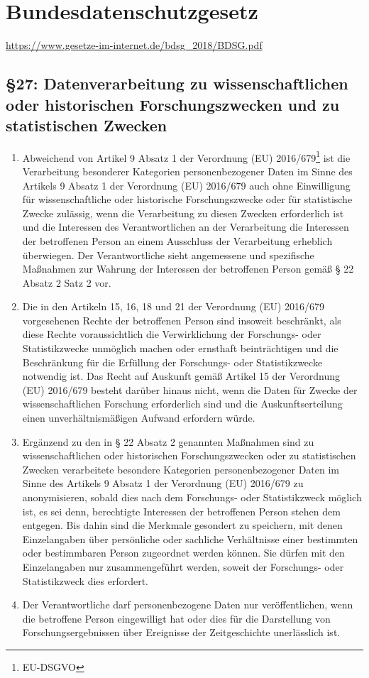 \documentclass[A4, 12pt]{scrbook}
\begin{document}
\chapter{Bundesdatenschutzgesetz}
\newline
\url{https://www.gesetze-im-internet.de/bdsg_2018/BDSG.pdf}
    \section[\S 27: Datenverarbeitung zu \dots statistischen Zwecken]{\S 27: Datenverarbeitung zu wissenschaftlichen oder historischen Forschungszwecken und zu statistischen Zwecken}
        \begin{enumerate}[label=(\arabic*)]
            \item Abweichend von Artikel 9 Absatz 1 der Verordnung (EU) 2016/679\footnote{EU-DSGVO} ist die Verarbeitung besonderer Kategorien personenbezogener Daten im Sinne des Artikels 9 Absatz 1 der Verordnung (EU) 2016/679 auch ohne Einwilligung für wissenschaftliche oder historische Forschungszwecke oder für statistische Zwecke zulässig, wenn die Verarbeitung zu diesen Zwecken erforderlich ist und die Interessen des Verantwortlichen an der Verarbeitung die Interessen der betroffenen Person an einem Ausschluss der Verarbeitung erheblich überwiegen. Der Verantwortliche sieht angemessene und spezifische Maßnahmen zur Wahrung der Interessen der betroffenen Person gemäß § 22 Absatz 2 Satz 2 vor.
            \item Die in den Artikeln 15, 16, 18 und 21 der Verordnung (EU) 2016/679 vorgesehenen Rechte der betroffenen Person sind insoweit beschränkt, als diese Rechte voraussichtlich die Verwirklichung der Forschungs- oder Statistikzwecke unmöglich machen oder ernsthaft beinträchtigen und die Beschränkung für die Erfüllung der Forschungs- oder Statistikzwecke notwendig ist. Das Recht auf Auskunft gemäß Artikel 15 der Verordnung (EU) 2016/679 besteht darüber hinaus nicht, wenn die Daten für Zwecke der wissenschaftlichen Forschung erforderlich sind und die Auskunftserteilung einen unverhältnismäßigen Aufwand erfordern würde.
            \item Ergänzend zu den in § 22 Absatz 2 genannten Maßnahmen sind zu wissenschaftlichen oder historischen Forschungszwecken oder zu statistischen Zwecken verarbeitete besondere Kategorien personenbezogener Daten im Sinne des Artikels 9 Absatz 1 der Verordnung (EU) 2016/679 zu anonymisieren, sobald dies nach dem Forschungs- oder Statistikzweck möglich ist, es sei denn, berechtigte Interessen der betroffenen Person stehen dem entgegen. Bis dahin sind die Merkmale gesondert zu speichern, mit denen Einzelangaben über persönliche oder sachliche Verhältnisse einer bestimmten oder bestimmbaren Person zugeordnet werden können. Sie dürfen mit den Einzelangaben nur zusammengeführt werden, soweit der Forschungs- oder Statistikzweck dies erfordert.
            \item Der Verantwortliche darf personenbezogene Daten nur veröffentlichen, wenn die betroffene Person eingewilligt hat oder dies für die Darstellung von Forschungsergebnissen über Ereignisse der Zeitgeschichte unerlässlich ist.
        \end{enumerate}
\end{document}
